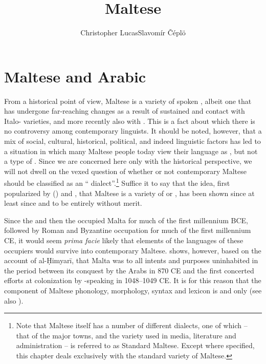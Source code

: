 \documentclass[output=paper]{langsci/langscibook}
\title{Maltese}
\author{Christopher Lucas\affiliation{SOAS University of London}\lastand Slavomír Čéplö\affiliation{Institute of Oriental Studies, Slovak Academy of Sciences/IMAFO Abteilung Byzanzforschung, Österreichische Akademie der Wissenschaften}}
\begin{document}
\maketitle
\section{Maltese and Arabic}\largerpage %
From a historical point of view, Maltese is a variety of spoken , albeit one that has undergone far-reaching changes as a result of sustained and  contact with Italo- varieties, and more recently also with . This is a fact about which there is no controversy among contemporary linguists. It should be noted, however, that a mix of social, cultural, historical, political, and indeed linguistic factors has led to a situation in which many Maltese people today view their language as , but not a type of . Since we are concerned here only with the historical perspective, we will not dwell on the vexed question of whether or not contemporary Maltese should be classified as an `` dialect''.\footnote{Note that Maltese itself has a number of different dialects, one of which -- that of the major towns, and the variety used in media, literature and administration -- is referred to as  Standard Maltese. Except where specified, this chapter deals exclusively with the standard variety of Maltese.} Suffice it to say that the idea, first popularized by \citeauthor{desoldanis1750} (\citeyear{desoldanis1750}) and \cite{vassalli1791}, that Maltese is a variety of  or , has been shown since at least since \cite{gesenius1810} and \cite{desacy1829} to be entirely without merit.

Since the  and then the  occupied Malta for much of the first millennium BCE, followed by Roman and Byzantine occupation for much of the first millennium CE, it would seem \textit{prima facie} likely that elements of the languages of these occupiers would survive into contemporary Maltese. \cite{brincat1995} shows, however, based on the account of al-Ḥimyarī, that Malta was to all intents and purposes uninhabited in the period between its conquest by the Arabs in 870 CE and the first concerted efforts at colonization by -speaking  in 1048--1049 CE. It is for this reason that the  component of Maltese phonology, morphology, syntax and lexicon is  and  only (see also \citealt{grech1961}).
\end{document}
